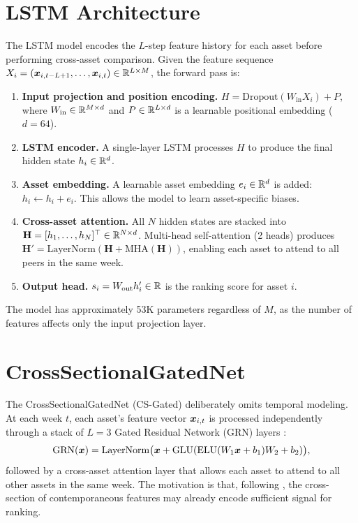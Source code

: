 \section{LSTM Architecture}
\label{sec:method:lstm}

The LSTM model encodes the $L$-step feature history for each asset
before performing cross-asset comparison.
Given the feature sequence $X_i = (\bm{x}_{i,t-L+1}, \dots, \bm{x}_{i,t}) \in \mathbb{R}^{L \times M}$,
the forward pass is:

\begin{enumerate}[nosep]
  \item \textbf{Input projection and position encoding.}
        $H = \mathrm{Dropout}(W_\text{in} X_i) + P$,
        where $W_\text{in} \in \mathbb{R}^{M \times d}$ and
        $P \in \mathbb{R}^{L \times d}$ is a learnable positional embedding ($d=64$).

  \item \textbf{LSTM encoder.}
        A single-layer LSTM processes $H$ to produce the final hidden
        state $h_i \in \mathbb{R}^d$.

  \item \textbf{Asset embedding.}
        A learnable asset embedding $e_i \in \mathbb{R}^d$ is added:
        $h_i \leftarrow h_i + e_i$.
        This allows the model to learn asset-specific biases.

  \item \textbf{Cross-asset attention.}
        All $N$ hidden states are stacked into
        $\mathbf{H} = [h_1, \dots, h_N]^\top \in \mathbb{R}^{N \times d}$.
        Multi-head self-attention (2 heads) produces
        $\mathbf{H}' = \mathrm{LayerNorm}(\mathbf{H} + \mathrm{MHA}(\mathbf{H}))$,
        enabling each asset to attend to all peers in the same week.

  \item \textbf{Output head.}
        $s_i = W_\text{out} h'_i \in \mathbb{R}$ is the ranking score for asset $i$.
\end{enumerate}

\noindent The model has approximately 53K parameters regardless of $M$,
as the number of features affects only the input projection layer.

\section{CrossSectionalGatedNet}
\label{sec:method:csgated}

The CrossSectionalGatedNet (CS-Gated) deliberately omits temporal
modeling.
At each week $t$, each asset's feature vector $\bm{x}_{i,t}$ is processed
independently through a stack of $L = 3$ Gated Residual Network (GRN)
layers \citep{lim2021temporal}:
\begin{equation}
  \mathrm{GRN}(\bm{x}) = \mathrm{LayerNorm}\bigl(\bm{x} + \mathrm{GLU}(\mathrm{ELU}(W_1 \bm{x} + b_1) W_2 + b_2)\bigr),
\end{equation}
followed by a cross-asset attention layer that allows each asset to
attend to all other assets in the same week.
The motivation is that, following \citet{gu2020empirical}, the cross-section
of contemporaneous features may already encode sufficient signal for ranking.

